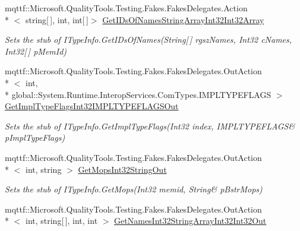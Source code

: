 \begin{DoxyCompactItemize}
mqttf\-::\-Microsoft.\-Quality\-Tools.\-Testing.\-Fakes.\-Fakes\-Delegates.\-Action\\*
$<$ string\mbox{[}$\,$\mbox{]}, int, int\mbox{[}$\,$\mbox{]}$>$ \hyperlink{class_system_1_1_runtime_1_1_interop_services_1_1_com_types_1_1_fakes_1_1_stub_i_type_info_a968085e2c984667683def3b6bd839ada}{Get\-I\-Ds\-Of\-Names\-String\-Array\-Int32\-Int32\-Array}
\begin{DoxyCompactList}\small\item\em Sets the stub of I\-Type\-Info.\-Get\-I\-Ds\-Of\-Names(\-String\mbox{[}$\,$\mbox{]} rgsz\-Names, Int32 c\-Names, Int32\mbox{[}$\,$\mbox{]} p\-Mem\-Id)\end{DoxyCompactList}\item 
mqttf\-::\-Microsoft.\-Quality\-Tools.\-Testing.\-Fakes.\-Fakes\-Delegates.\-Out\-Action\\*
$<$ int, \\*
global\-::\-System.\-Runtime.\-Interop\-Services.\-Com\-Types.\-I\-M\-P\-L\-T\-Y\-P\-E\-F\-L\-A\-G\-S $>$ \hyperlink{class_system_1_1_runtime_1_1_interop_services_1_1_com_types_1_1_fakes_1_1_stub_i_type_info_aa6e186f4367c797e6177c10f20da4aa9}{Get\-Impl\-Type\-Flags\-Int32\-I\-M\-P\-L\-T\-Y\-P\-E\-F\-L\-A\-G\-S\-Out}
\begin{DoxyCompactList}\small\item\em Sets the stub of I\-Type\-Info.\-Get\-Impl\-Type\-Flags(Int32 index, I\-M\-P\-L\-T\-Y\-P\-E\-F\-L\-A\-G\-S\& p\-Impl\-Type\-Flags)\end{DoxyCompactList}\item 
mqttf\-::\-Microsoft.\-Quality\-Tools.\-Testing.\-Fakes.\-Fakes\-Delegates.\-Out\-Action\\*
$<$ int, string $>$ \hyperlink{class_system_1_1_runtime_1_1_interop_services_1_1_com_types_1_1_fakes_1_1_stub_i_type_info_afbfdefe9b7c3d6daa7fa366b4b0482b8}{Get\-Mops\-Int32\-String\-Out}
\begin{DoxyCompactList}\small\item\em Sets the stub of I\-Type\-Info.\-Get\-Mops(Int32 memid, String\& p\-Bstr\-Mops)\end{DoxyCompactList}\item 
mqttf\-::\-Microsoft.\-Quality\-Tools.\-Testing.\-Fakes.\-Fakes\-Delegates.\-Out\-Action\\*
$<$ int, string\mbox{[}$\,$\mbox{]}, int, int $>$ \hyperlink{class_system_1_1_runtime_1_1_interop_services_1_1_com_types_1_1_fakes_1_1_stub_i_type_info_ac4c8f60e03e69210bb27eb992bd23d13}{Get\-Names\-Int32\-String\-Array\-Int32\-Int32\-Out}

\end{DoxyCompactItemize}
